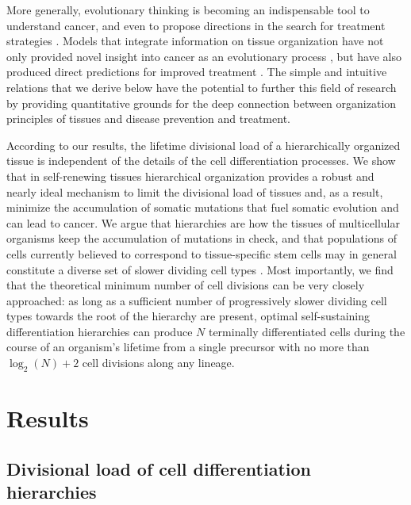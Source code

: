\documentclass[aps,singlecolumn]{revtex4-1}
\begin{document}

More generally, evolutionary thinking is becoming an indispensable
tool to understand cancer, and even to propose directions in the
search for treatment strategies \cite{Komarova:2015}.
Models that integrate information on
tissue organization have not only provided novel insight into cancer
as an evolutionary process \cite{Rejniak:2011,Altrock:2015,Hindersin:2016}, but have
also produced direct predictions for improved
treatment \cite{Michor:2015,Tang:2016,Werner:2016}. The simple and
intuitive relations that we derive below have the potential to further
this field of research by providing quantitative grounds for the deep
connection between organization principles of tissues and disease
prevention and treatment.


According to our results, the
lifetime divisional load of a hierarchically organized tissue is
independent of the details of the cell differentiation processes.
We show that in self-renewing tissues hierarchical organization
provides a robust and nearly ideal mechanism to limit the divisional
load of tissues and, as a result, minimize the accumulation of somatic
mutations that fuel somatic evolution and can lead to cancer.
We argue that
hierarchies are how the tissues of multicellular organisms keep the
accumulation of mutations in check, and that populations of cells
currently believed to correspond to tissue-specific stem cells
may in general constitute a diverse set of slower dividing cell
types \cite{Li:2010,Busch:2015}. 
Most importantly, we find that the theoretical minimum number
of cell divisions can be very closely approached: as long as a
sufficient number of progressively slower dividing cell types
towards the root of the hierarchy are present,
optimal self-sustaining differentiation hierarchies can
produce $N$ terminally differentiated cells during the course of an
organism's lifetime from a single precursor with no more than
$\log_2(N)+2$ cell divisions along any lineage.

\section*{Results}

\subsection*{Divisional load of cell differentiation hierarchies}
\end{document}
